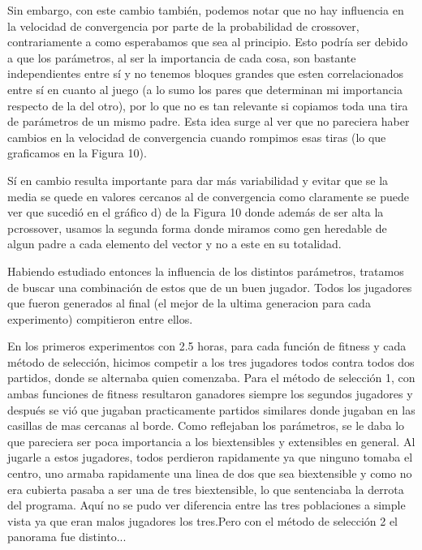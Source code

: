 \documentclass[A4paper,oneside,fleqn,11pt]{article}
\theoremstyle{definition}
\begin{document}
Sin embargo, con este cambio también, podemos notar que no hay influencia en la velocidad de convergencia por parte de la probabilidad de crossover, contrariamente a como esperabamos que sea al principio. Esto podría ser debido a que los parámetros, al ser la importancia de cada cosa, son bastante independientes entre sí y no tenemos bloques grandes que esten correlacionados entre sí en cuanto al juego (a lo sumo los pares que determinan mi importancia respecto de la del otro), por lo que no es tan relevante si copiamos toda una tira de parámetros de un mismo padre. Esta idea surge al ver que no pareciera haber cambios en la velocidad de convergencia cuando rompimos esas tiras (lo que graficamos en la Figura 10).

Sí en cambio resulta importante para dar más variabilidad y evitar que se la media se quede en valores cercanos al de convergencia como claramente se puede ver que sucedió en el gráfico d) de la Figura 10 donde además de ser alta la pcrossover, usamos la segunda forma donde miramos como gen heredable de algun padre a cada elemento del vector y no a este en su totalidad.

Habiendo estudiado entonces la influencia de los distintos parámetros, tratamos de buscar una combinación de estos que de un buen jugador. Todos los jugadores que fueron generados al final (el mejor de la ultima generacion para cada experimento) compitieron entre ellos.

En los primeros experimentos con 2.5 horas, para cada función de fitness y cada método de selección, hicimos competir a los tres jugadores todos contra todos dos partidos, donde se alternaba quien comenzaba. Para el método de selección 1, con ambas funciones de fitness resultaron ganadores siempre los segundos jugadores y después se vió que jugaban practicamente partidos similares donde jugaban en las casillas de mas cercanas al borde. Como reflejaban los parámetros, se le daba lo que pareciera ser poca importancia a los biextensibles y extensibles en general. Al jugarle a estos jugadores, todos perdieron rapidamente ya que ninguno tomaba el centro, uno armaba rapidamente una linea de dos que sea biextensible y como no era cubierta pasaba a ser una de tres biextensible, lo que sentenciaba la derrota del programa. Aquí no se pudo ver diferencia entre las tres poblaciones a simple vista ya que eran malos jugadores los tres.Pero con el método de selección 2 el panorama fue distinto...
\end{document}

